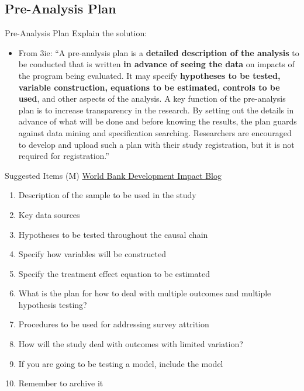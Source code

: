 \documentclass{beamer}
\begin{document}
\subsection*{Pre-Analysis Plan}
\begin{frame}{Pre-Analysis Plan}
Explain the solution:
\begin{itemize}
\item
From 3ie: ``A pre-analysis plan is a \textbf{detailed description of the analysis} to be conducted that is written \textbf{in advance of seeing the data} on impacts of the program being evaluated. It may specify\textbf{ hypotheses to be tested, variable construction, equations to be estimated, controls to be used}, and other aspects of the analysis. A key function of the pre-analysis plan is to increase transparency in the research. By setting out the details in advance of what will be done and before knowing the results, the plan guards against data mining and specification searching. Researchers are encouraged to develop and upload such a plan with their study registration, but it is not required for registration.''
\end{itemize}
\end{frame}

\begin{frame}{Suggested Items (M)}
\href{http://blogs.worldbank.org/impactevaluations/a-pre-analysis-plan-checklist}{World Bank Development Impact Blog}

\begin{enumerate}[<.->]
\item
  Description of the sample to be used in the study
\item
  Key data sources
\item
  Hypotheses to be tested throughout the causal chain
\item
  Specify how variables will be constructed
\item
  Specify the treatment effect equation to be estimated
\item
  What is the plan for how to deal with multiple outcomes and multiple
  hypothesis testing?
\item
  Procedures to be used for addressing survey attrition
\item
  How will the study deal with outcomes with limited variation?
\item
  If you are going to be testing a model, include the model
\item
  Remember to archive it
\end{enumerate}
\end{frame}
\end{document}
